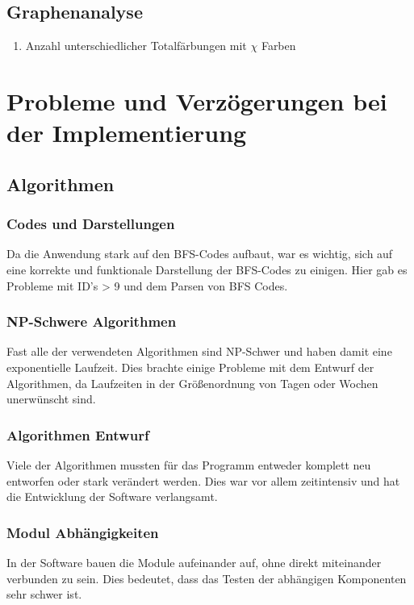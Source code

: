 \documentclass[13pt]{scrreprt}
\begin{document}
\section{Graphenanalyse}
\begin{addmargin}[25pt]{0pt}
	\begin{enumerate} [label=FA\arabic*,start=615]
		\item Anzahl unterschiedlicher Totalfärbungen mit $\chi$ Farben
	\end{enumerate}
\end{addmargin}


\chapter{Probleme und Verzögerungen bei der Implementierung}

\section{Algorithmen}
\subsection{Codes und Darstellungen}
Da die Anwendung stark auf den BFS-Codes aufbaut, war es wichtig, sich auf eine korrekte und funktionale Darstellung der BFS-Codes zu einigen.
Hier gab es Probleme mit ID's > 9 und dem Parsen von BFS Codes.
\subsection{NP-Schwere Algorithmen}
Fast alle der verwendeten Algorithmen sind NP-Schwer und haben damit eine exponentielle Laufzeit.
Dies brachte einige Probleme mit dem Entwurf der Algorithmen, da Laufzeiten in der Größenordnung von Tagen oder Wochen unerwünscht sind.
\subsection{Algorithmen Entwurf}
Viele der Algorithmen mussten für das Programm entweder komplett neu entworfen oder stark verändert werden. Dies war vor allem zeitintensiv und hat die Entwicklung der Software verlangsamt.
\subsection{Modul Abhängigkeiten}
In der Software bauen die Module aufeinander auf, ohne direkt miteinander verbunden zu sein. Dies bedeutet, dass das Testen der abhängigen Komponenten sehr schwer ist.
\end{document}
